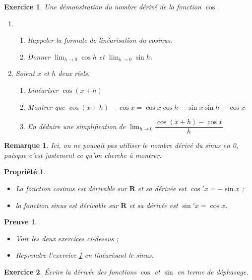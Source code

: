 \documentclass[11pt,a4paper,french]{article}
\newcommand{\R}{\mathbf{R}}
\theoremstyle{break}
\newtheorem{propriete}{Propriété}
\theoremstyle{plain}
\newtheorem{exerciceT}{Exercice}
\theoremstyle{nonumberplain}
\newtheorem{remarque}{Remarque}
\newtheorem{preuve}{Preuve}
\theoremstyle{nonumberbreak}
\newenvironment{exercice}{\begin{framed}\begin{exerciceT}}{\end{exerciceT}\end{framed}}
\begin{document}
\begin{exercice}\label{ex:nb_deriv_cos}
  Une démonstration du nombre dérivé de la fonction $\cos$.

  \begin{enumerate}
    \item \begin{enumerate}
        \item Rappeler la formule de linéarisation du cosinus.
        \item Donner $\lim_{h\to 0}\cos h$ et $\lim_{h\to 0}\sin h$.
      \end{enumerate}
    \item Soient $x$ et $h$ deux réels.
      \begin{enumerate}
        \item Linéariser $\cos(x+h)$
        \item Montrer que $\cos(x + h) - \cos x = \cos x\cos h - \sin x
          \sin h - \cos x$
        \item En déduire une simplification de $\lim_{h\to
          0}\dfrac{\cos(x + h) - \cos x}{h}$
      \end{enumerate}
  \end{enumerate}
\end{exercice}

\begin{remarque}
  Ici, on ne pouvait pas utiliser le nombre dérivé du sinus en 0, puisque
  c'est justement ce qu'on cherche à montrer.
\end{remarque}

\begin{propriete}
  \begin{itemize}
    \item La fonction cosinus est dérivable sur $\R$ et sa dérivée est
      $\cos'x = -\sin x$ ;
    \item la fonction sinus est dérivable sur $\R$ et sa dérivée est
      $\sin'x = \cos x$.
  \end{itemize}
\end{propriete}
\begin{preuve}
  \begin{itemize}
    \item Voir les deux exercices ci-dessus ;
    \item Reprendre l'exercice \ref{ex:nb_deriv_cos} en linéarisant le
      sinus.
  \end{itemize}
\end{preuve}

\begin{exercice}
  Écrire la dérivée des fonctions $\cos$ et $\sin$ en terme de
  déphasage.
\end{exercice}
\end{document}
